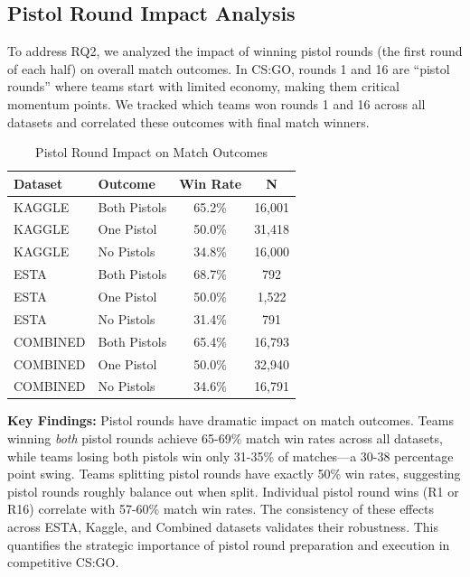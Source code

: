 \documentclass[10pt,twocolumn]{article}
\begin{document}
\subsection{Pistol Round Impact Analysis}
To address RQ2, we analyzed the impact of winning pistol rounds (the first round of each half) on overall match outcomes. In CS:GO, rounds 1 and 16 are ``pistol rounds'' where teams start with limited economy, making them critical momentum points. We tracked which teams won rounds 1 and 16 across all datasets and correlated these outcomes with final match winners.

\begin{table}[h]
\centering
\caption{Pistol Round Impact on Match Outcomes}
\label{tab:pistol_impact}
\scriptsize
\setlength{\tabcolsep}{3pt}
\begin{tabular}{llcc}
\toprule
\textbf{Dataset} & \textbf{Outcome} & \textbf{Win Rate} & \textbf{N} \\
\midrule
KAGGLE & Both Pistols & 65.2\% & 16,001 \\
KAGGLE & One Pistol & 50.0\% & 31,418 \\
KAGGLE & No Pistols & 34.8\% & 16,000 \\
\midrule
ESTA & Both Pistols & 68.7\% & 792 \\
ESTA & One Pistol & 50.0\% & 1,522 \\
ESTA & No Pistols & 31.4\% & 791 \\
\midrule
COMBINED & Both Pistols & 65.4\% & 16,793 \\
COMBINED & One Pistol & 50.0\% & 32,940 \\
COMBINED & No Pistols & 34.6\% & 16,791 \\
\bottomrule
\end{tabular}
\end{table}

\textbf{Key Findings:} Pistol rounds have dramatic impact on match outcomes. Teams winning \textit{both} pistol rounds achieve 65-69\% match win rates across all datasets, while teams losing both pistols win only 31-35\% of matches---a 30-38 percentage point swing. Teams splitting pistol rounds have exactly 50\% win rates, suggesting pistol rounds roughly balance out when split. Individual pistol round wins (R1 or R16) correlate with 57-60\% match win rates. The consistency of these effects across ESTA, Kaggle, and Combined datasets validates their robustness. This quantifies the strategic importance of pistol round preparation and execution in competitive CS:GO.
\end{document}
